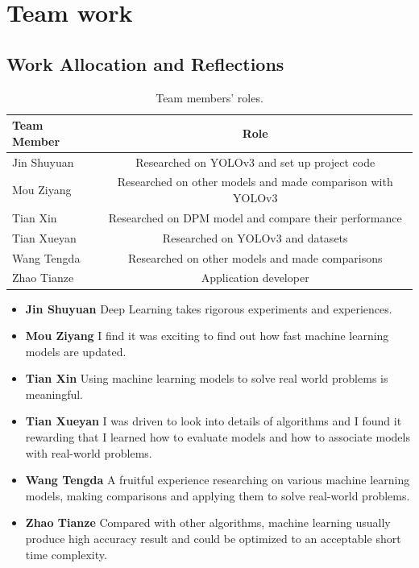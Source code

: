 \documentclass[letterpaper]{article} %
\begin{document}
\section{Team work}
\subsection{Work Allocation and Reflections}
\begin{table}[ht!]
\centering
\resizebox{1\linewidth}{!}
{
\begin{tabular}{|l|c|}
\hline
\textbf{Team Member} &  \textbf{Role}  \\ \hline
Jin Shuyuan &  Researched on YOLOv3 and set up project code\\
\hline
Mou Ziyang & Researched on other models and made comparison with YOLOv3\\ \hline
Tian Xin & Researched on DPM model and compare their performance \\ \hline
Tian Xueyan & Researched on YOLOv3 and datasets \\ \hline
Wang Tengda & Researched on other models and made comparisons \\ \hline
Zhao Tianze & Application developer\\ \hline
\end{tabular}
}
\vspace{-2mm}
\caption{\footnotesize{Team members' roles.}}
\label{tab:time}\vspace{-1em}
\end{table}

\begin{itemize}
    \item {\textbf{Jin Shuyuan}}
Deep Learning takes rigorous experiments and experiences.
\item{\textbf{Mou Ziyang}}
I find it was exciting to find out how fast machine learning models are updated.
\item{\textbf{Tian Xin}}
Using machine learning models to solve real world problems is meaningful.
\item{\textbf{Tian Xueyan}}
I was driven to look into details of algorithms and I found it rewarding that I learned how to evaluate models and how to associate models with real-world problems.
\item{\textbf{Wang Tengda}}
A fruitful experience researching on various machine learning models, making comparisons and applying them to solve real-world problems. 
\item{\textbf{Zhao Tianze}}
Compared with other algorithms, machine learning usually produce high accuracy result and could be optimized to an acceptable short time complexity. 
\end{itemize}




\end{document}
